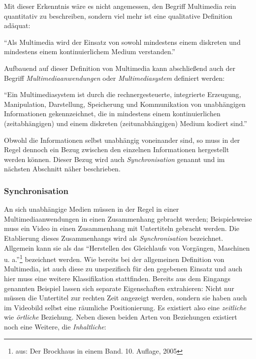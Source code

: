   Mit dieser Erkenntnis wäre es nicht angemessen, den Begriff Multimedia rein quantitativ zu beschreiben, sondern viel mehr ist eine qualitative Definition adäquat:

  \begin{definition}[Multimedia]\label{def:multimedia}
    "`Als Multimedia wird der Einsatz von sowohl mindestens einem diskreten und mindestens einem kontinuierlichem Medium verstanden."'~\emph{\citep[S. 14]{multimedia_technologie}}
  \end{definition}
  
  Aufbauend auf dieser Definition von Multimedia kann abschließend auch der Begriff \emph{Multimediaanwendungen} oder \emph{Multimediasystem} definiert werden:

  \begin{definition}[Multimediasystem]\label{def:multimediasystem}
    "`Ein Multimediasystem ist durch die rechnergesteuerte, integrierte Erzeugung, Manipulation, Darstellung, Speicherung und Kommunikation von unabhängigen Informationen gekennzeichnet, die in mindestens einem kontinuierlichen (zeitabhängigen) und einem diskreten (zeitunabhängigen) Medium kodiert sind."'~\emph{\citep[S. 13]{multimedia_technologie}}
  \end{definition}
  

  Obwohl die Informationen selbst unabhängig voneinander sind, so muss in der Regel dennoch ein Bezug zwischen den einzelnen Informationen hergestellt werden können. Dieser Bezug wird auch \emph{Synchronisation} genannt und im nächsten Abschnitt näher beschrieben.

\subsubsection{Synchronisation} %
\label{ssub:synchronisation}

  An sich unabhängige Medien müssen in der Regel in einer Multimediaanwendungen in einen Zusammenhang gebracht werden; Beispielsweise muss ein Video in einen Zusammenhang mit Untertiteln gebracht werden. Die Etablierung dieses Zusammenhangs wird als \emph{Synchronisation} bezeichnet. Allgemein kann sie als das "`Herstellen des Gleichlaufs von Vorgängen, Maschinen u. a."'\footnote{aus: Der Brockhaus in einem Band. 10. Auflage, 2005} bezeichnet werden. Wie bereits bei der allgemeinen Definition von Multimedia, ist auch diese zu unspezifisch für den gegebenen Einsatz und auch hier muss eine weitere Klassifikation stattfinden. Bereits aus dem Eingangs genannten Beispiel lassen sich separate Eigenschaften extrahieren: Nicht nur müssen die Untertitel zur rechten Zeit angezeigt werden, sondern sie haben auch im Videobild selbst eine räumliche Positionierung. Es existiert also eine \emph{zeitliche} wie \emph{örtliche} Beziehung. Neben diesen beiden Arten von Beziehungen existiert noch eine Weitere, die \emph{Inhaltliche}:
  
